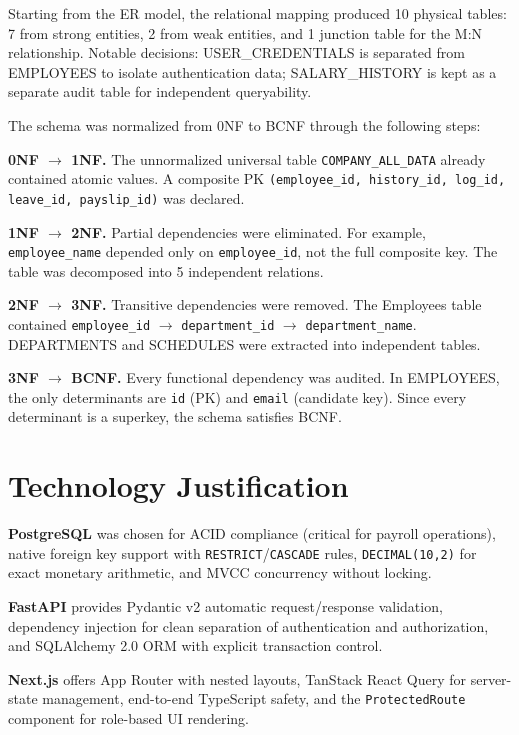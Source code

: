 \documentclass[twocolumn,12pt]{article}
\begin{document}
Starting from the ER model, the relational mapping produced 10 physical tables: 7 from strong entities, 2 from weak entities, and 1 junction table for the M:N relationship. Notable decisions: USER\_CREDENTIALS is separated from EMPLOYEES to isolate authentication data; SALARY\_HISTORY is kept as a separate audit table for independent queryability.

The schema was normalized from 0NF to BCNF through the following steps:

\textbf{0NF $\rightarrow$ 1NF.} The unnormalized universal table \texttt{COMPANY\_ALL\_DATA} already contained atomic values. A composite PK \texttt{(employee\_id, history\_id, log\_id, leave\_id, payslip\_id)} was declared.

\textbf{1NF $\rightarrow$ 2NF.} Partial dependencies were eliminated. For example, \texttt{employee\_name} depended only on \texttt{employee\_id}, not the full composite key. The table was decomposed into 5 independent relations.

\textbf{2NF $\rightarrow$ 3NF.} Transitive dependencies were removed. The Employees table contained \texttt{employee\_id} $\rightarrow$ \texttt{department\_id} $\rightarrow$ \texttt{department\_name}. DEPARTMENTS and SCHEDULES were extracted into independent tables.

\textbf{3NF $\rightarrow$ BCNF.} Every functional dependency was audited. In EMPLOYEES, the only determinants are \texttt{id} (PK) and \texttt{email} (candidate key). Since every determinant is a superkey, the schema satisfies BCNF.

\section{Technology Justification}

\textbf{PostgreSQL} was chosen for ACID compliance (critical for payroll operations), native foreign key support with \texttt{RESTRICT}/\texttt{CASCADE} rules, \texttt{DECIMAL(10,2)} for exact monetary arithmetic, and MVCC concurrency without locking.

\textbf{FastAPI} provides Pydantic v2 automatic request/response validation, dependency injection for clean separation of authentication and authorization, and SQLAlchemy 2.0 ORM with explicit transaction control.

\textbf{Next.js} offers App Router with nested layouts, TanStack React Query for server-state management, end-to-end TypeScript safety, and the \texttt{ProtectedRoute} component for role-based UI rendering.
\end{document}

